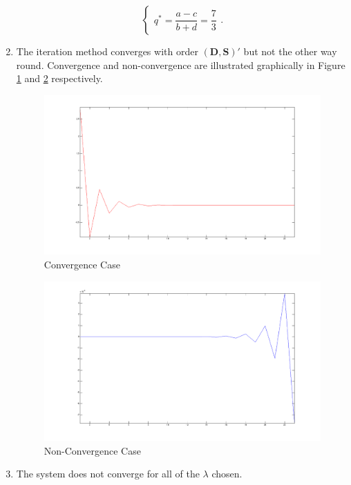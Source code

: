 \begin{enumerate}
\begin{equation}
\begin{cases}
					q^*=\dfrac{a-c}{b+d}=\dfrac{7}{3}
				\end{cases}.
			\end{equation}
\item The iteration method converges with order $(\mathbf D, \mathbf S)'$ but not the other way round. Convergence and non-convergence are illustrated graphically in Figure \ref{convergence} and \ref{nonconvergence} respectively.
        \begin{figure}[htbp]
        	\begin{center}
        		\includegraphics[width=12cm]{Plot/Q1/Convergence.png}
        		\caption{Convergence Case}
				\label{convergence}
			\end{center}
		\end{figure}
		\begin{figure}[htbp]
			\begin{center}
	        	\includegraphics[width=12cm]{Plot/Q1/Nonconvergence.png}
        		\caption{Non-Convergence Case}
				\label{nonconvergence}
			\end{center}
        \end{figure}
\item The system does not converge for all of the $\lambda$ chosen.
\end{enumerate}

